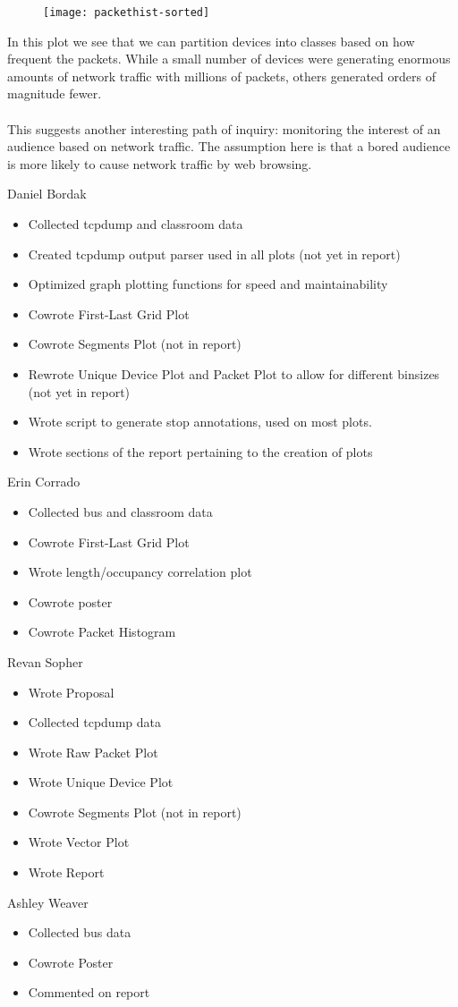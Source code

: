 \documentclass[11pt,journal,compsoc]{IEEEtran} %
\begin{document}
	\begin{figure}[!t]
		\texttt{[image: packethist-sorted]}
		\end{figure}

	In this plot we see that we can partition devices into classes based on how frequent the packets.
	While a small number of devices were generating enormous amounts of network traffic with millions of packets, others generated orders of magnitude fewer.
	\\\\
	This suggests another interesting path of inquiry: monitoring the interest of an audience based on network traffic.
	The assumption here is that a bored audience is more likely to cause network traffic by web browsing.

Daniel Bordak
\begin{itemize}
  \item Collected tcpdump and classroom data
  \item Created tcpdump output parser used in all plots (not yet in report)
  \item Optimized graph plotting functions for speed and maintainability
  \item Cowrote First-Last Grid Plot
  \item Cowrote Segments Plot (not in report)
  \item Rewrote Unique Device Plot and Packet Plot to allow for different binsizes (not yet in report)
  \item Wrote script to generate stop annotations, used on most plots.
  \item Wrote sections of the report pertaining to the creation of plots
\end{itemize}
Erin Corrado
\begin{itemize}
  \item Collected bus and classroom data
  \item Cowrote First-Last Grid Plot
  \item Wrote length/occupancy correlation plot
  \item Cowrote poster
  \item Cowrote Packet Histogram
\end{itemize}
Revan Sopher
\begin{itemize}
  \item Wrote Proposal
  \item Collected tcpdump data
  \item Wrote Raw Packet Plot
  \item Wrote Unique Device Plot
  \item Cowrote Segments Plot (not in report)
  \item Wrote Vector Plot
  \item Wrote Report
\end{itemize}
Ashley Weaver
\begin{itemize}
  \item Collected bus data
  \item Cowrote Poster
  \item Commented on report
\end{itemize}
\end{document}
